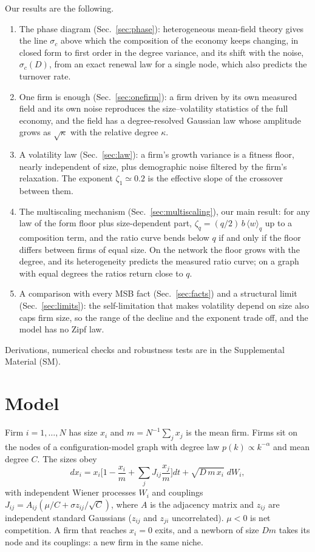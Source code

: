 \documentclass[pre,twocolumn,superscriptaddress,nofootinbib]{revtex4-2}
\begin{document}
Our results are the following.
\begin{enumerate}
\item The phase diagram (Sec.~\ref{sec:phase}): heterogeneous mean-field theory gives the line
  $\sigma_c$ above which the composition of the economy keeps changing, in closed form to first
  order in the degree variance, and its shift with the noise, $\sigma_c(D)$, from an exact renewal law
  for a single node, which also predicts the turnover rate.
\item One firm is enough (Sec.~\ref{sec:onefirm}): a firm driven by its own measured field and its own
  noise reproduces the size--volatility statistics of the full economy, and the field has a
  degree-resolved Gaussian law whose amplitude grows as $\sqrt\kappa$ with the relative degree
  $\kappa$.
\item A volatility law (Sec.~\ref{sec:law}): a firm's growth variance is a fitness floor, nearly
  independent of size, plus demographic noise filtered by the firm's relaxation.  The exponent
  $\zeta_1\simeq0.2$ is the effective slope of the crossover between them.
\item The multiscaling mechanism (Sec.~\ref{sec:multiscaling}), our main result: for any law of the
  form floor plus size-dependent part, $\zeta_q=(q/2)\,b\,\langle w\rangle_q$ up to a composition term, and the ratio curve
  bends below $q$ if and only if the floor differs between firms of equal size.  On the network the
  floor grows with the degree, and its heterogeneity predicts the measured ratio curve; on a graph
  with equal degrees the ratios return close to $q$.
\item A comparison with every MSB fact (Sec.~\ref{sec:facts}) and a structural limit
  (Sec.~\ref{sec:limits}): the self-limitation that makes volatility depend on size also caps firm
  size, so the range of the decline and the exponent trade off, and the model has no Zipf law.
\end{enumerate}
Derivations, numerical checks and robustness tests are in the Supplemental Material (SM).

\section{Model}
\label{sec:model}

Firm $i=1,\dots,N$ has size $x_i$ and $m=N^{-1}\sum_jx_j$ is the mean firm.  Firms sit on the nodes
of a configuration-model graph with degree law $p(k)\propto k^{-\alpha}$ and mean degree $C$.  The
sizes obey
\begin{equation}
dx_i=x_i\Big[1-\frac{x_i}{m}+\sum_jJ_{ij}\frac{x_j}{m}\Big]dt+\sqrt{D\,m\,x_i}\;dW_i ,
\label{eq:model}
\end{equation}
with independent Wiener processes $W_i$ and couplings $J_{ij}=A_{ij}(\mu/C+\sigma z_{ij}/\sqrt C)$, where $A$
is the adjacency matrix and $z_{ij}$ are independent standard Gaussians ($z_{ij}$ and $z_{ji}$
uncorrelated).  $\mu<0$ is net competition.  A firm that reaches $x_i=0$ exits, and a newborn of size
$Dm$ takes its node and its couplings: a new firm in the same niche.
\end{document}
